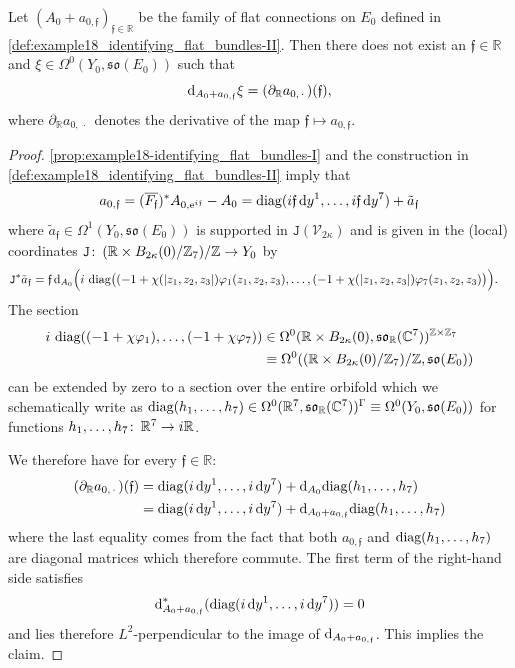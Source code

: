 \documentclass[11pt,a4paper]{scrartcl}
\newcommand*\diff{\mathop{}\!\textup{d}}
\newcommand{\col}{\colon \thinspace}
\newcommand{\e}{\textup{e}}
\newcommand{\diag}{\textup{diag}}
\numberwithin{equation}{section}
\theoremstyle{plain}
\theoremstyle{definition}
\theoremstyle{remark}
\begin{document}
\begin{proposition}\label{prop:example18_family_not_tangent_to_gaugeorbig}
Let $(A_0+a_{0,\mathfrak{f}})_{\mathfrak{f}\in \mathbb{R}}$ be the family of flat connections on $E_0$ defined in \autoref{def:example18_identifying_flat_bundles-II}. Then there does not exist an $\mathfrak{f} \in \mathbb{R}$ and $\xi \in \Omega^0(Y_0,\mathfrak{so}(E_{0}))$ such that \[ \diff_{A_0+a_{0,\mathfrak{f}}} \xi = (\partial_{\mathbb{R}} a_{0,\, \cdot\, })(\mathfrak{f}),\] where $\partial_{\mathbb{R}} a_{0,\, \cdot\, }$ denotes the derivative of the map $\mathfrak{f} \mapsto a_{0,\mathfrak{f}}$.
\end{proposition}
\begin{proof}
\autoref{prop:example18-identifying_flat_bundles-I} and the construction in \autoref{def:example18_identifying_flat_bundles-II} imply that \[a_{0,\mathfrak{f}} = (\overline{F_{\mathfrak{f}}})^*A_{0,\e^{i\mathfrak{f}}} - A_{0} = \diag(i\mathfrak{f} \diff y^1,\dots, i \mathfrak{f} \diff y^7) + \tilde{a}_{\mathfrak{f}} \] where $\tilde{a}_{\mathfrak{f}} \in \Omega^1(Y_0,\mathfrak{so}(E_{0}))$ is supported in $\mathtt{J}(\mathcal{V}_{2\kappa})$ and is given in the (local) coordinates $\mathtt{J} \col (\mathbb{R}\times B_{2\kappa}(0)/\mathbb{Z}_7)/\mathbb{Z} \to Y_0$ by
\begin{align*}
\mathtt{J}^* \tilde{a}_{\mathfrak{f}} &= \mathfrak{f} \diff_{A_{0}} \Big( i\  \diag\big((-1+\chi(\vert z_1,z_2,z_3\vert) \varphi_1(z_1,z_2,z_3),\dots,(-1+\chi(\vert z_1,z_2,z_3\vert) \varphi_7(z_1,z_2,z_3)\big)\Big).
\end{align*}
The section \begin{align*}
i\ \diag((-1+\chi \varphi_1),\dots,(-1+\chi \varphi_7)) & \in  \Omega^0(\mathbb{R}\times B_{2\kappa}(0),\mathfrak{so}_\mathbb{R}(\mathbb{C}^7))^{\mathbb{Z}\times \mathbb{Z}_7}\\
& \equiv \Omega^0((\mathbb{R}\times B_{2\kappa}(0)/\mathbb{Z}_7)/\mathbb{Z},\mathfrak{so}(E_{0}))
\end{align*}  
can be extended by zero to a section over the entire orbifold which we schematically write as $\diag(h_1,\dots,h_7) \in \Omega^0(\mathbb{R}^7,\mathfrak{so}_{\mathbb{R}}(\mathbb{C}^7))^\Gamma \equiv \Omega^0(Y_0,\mathfrak{so}(E_{0}))$ for functions $h_1,\dots,h_7 \col \mathbb{R}^7 \to i\mathbb{\mathbb{R}}$.

We therefore have for every $\mathfrak{f} \in \mathbb{R}$: 
\begin{align*}
(\partial_{\mathbb{R}} a_{0,\, \cdot\, })(\mathfrak{f}) &=  \diag(i \diff y^1,\dots,i \diff y^7) +  \diff_{A_{0}} \diag(h_1,\dots,h_7) \\
&=  \diag(i \diff y^1,\dots,i \diff y^7) + \diff_{A_0+a_{0,\mathfrak{f}}} \diag(h_1,\dots,h_7)
\end{align*}
where the last equality comes from the fact that both $a_{0,\mathfrak{f}}$ and $\diag(h_1,\dots,h_7)$ are diagonal matrices which therefore commute. The first term of the right-hand side satisfies \[ \diff_{A_0+a_{0,\mathfrak{f}}}^* (\diag(i \diff y^1,\dots, i \diff y^7)) = 0 \] and lies therefore $L^2$-perpendicular to the image of $\diff_{A_0+a_{0,\mathfrak{f}}}$. This implies the claim.
\end{proof}
\end{document}
